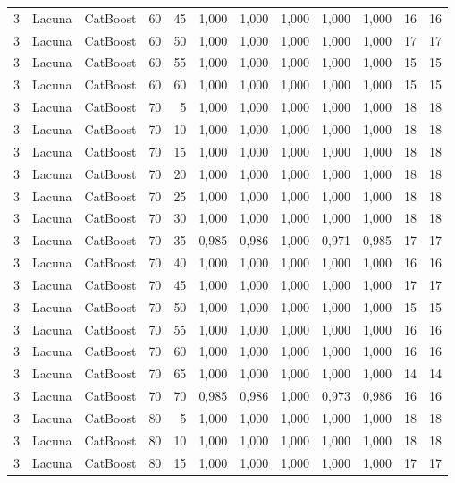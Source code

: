 \begin{longtable}{@{}rllrrrrrrrrr@{}}
3 & Lacuna & CatBoost & 60 & 45 & 1,000 & 1,000 & 1,000 & 1,000 & 1,000 & 16 & 16 \\
3 & Lacuna & CatBoost & 60 & 50 & 1,000 & 1,000 & 1,000 & 1,000 & 1,000 & 17 & 17 \\
3 & Lacuna & CatBoost & 60 & 55 & 1,000 & 1,000 & 1,000 & 1,000 & 1,000 & 15 & 15 \\
3 & Lacuna & CatBoost & 60 & 60 & 1,000 & 1,000 & 1,000 & 1,000 & 1,000 & 15 & 15 \\
3 & Lacuna & CatBoost & 70 & 5 & 1,000 & 1,000 & 1,000 & 1,000 & 1,000 & 18 & 18 \\
3 & Lacuna & CatBoost & 70 & 10 & 1,000 & 1,000 & 1,000 & 1,000 & 1,000 & 18 & 18 \\
3 & Lacuna & CatBoost & 70 & 15 & 1,000 & 1,000 & 1,000 & 1,000 & 1,000 & 18 & 18 \\
3 & Lacuna & CatBoost & 70 & 20 & 1,000 & 1,000 & 1,000 & 1,000 & 1,000 & 18 & 18 \\
3 & Lacuna & CatBoost & 70 & 25 & 1,000 & 1,000 & 1,000 & 1,000 & 1,000 & 18 & 18 \\
3 & Lacuna & CatBoost & 70 & 30 & 1,000 & 1,000 & 1,000 & 1,000 & 1,000 & 18 & 18 \\
3 & Lacuna & CatBoost & 70 & 35 & 0,985 & 0,986 & 1,000 & 0,971 & 0,985 & 17 & 17 \\
3 & Lacuna & CatBoost & 70 & 40 & 1,000 & 1,000 & 1,000 & 1,000 & 1,000 & 16 & 16 \\
3 & Lacuna & CatBoost & 70 & 45 & 1,000 & 1,000 & 1,000 & 1,000 & 1,000 & 17 & 17 \\
3 & Lacuna & CatBoost & 70 & 50 & 1,000 & 1,000 & 1,000 & 1,000 & 1,000 & 15 & 15 \\
3 & Lacuna & CatBoost & 70 & 55 & 1,000 & 1,000 & 1,000 & 1,000 & 1,000 & 16 & 16 \\
3 & Lacuna & CatBoost & 70 & 60 & 1,000 & 1,000 & 1,000 & 1,000 & 1,000 & 16 & 16 \\
3 & Lacuna & CatBoost & 70 & 65 & 1,000 & 1,000 & 1,000 & 1,000 & 1,000 & 14 & 14 \\
3 & Lacuna & CatBoost & 70 & 70 & 0,985 & 0,986 & 1,000 & 0,973 & 0,986 & 16 & 16 \\
3 & Lacuna & CatBoost & 80 & 5 & 1,000 & 1,000 & 1,000 & 1,000 & 1,000 & 18 & 18 \\
3 & Lacuna & CatBoost & 80 & 10 & 1,000 & 1,000 & 1,000 & 1,000 & 1,000 & 18 & 18 \\
3 & Lacuna & CatBoost & 80 & 15 & 1,000 & 1,000 & 1,000 & 1,000 & 1,000 & 17 & 17 \\

\end{longtable}
